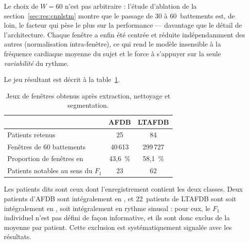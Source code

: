 Le choix de \(W = 60\) n'est pas arbitraire : l'étude d'ablation de la section~\ref{sec:res:cnnlstm} montre que le passage de 30 à 60~battements est, de loin, le facteur qui pèse le plus sur la performance — davantage que le détail de l'architecture. Chaque fenêtre a enfin été centrée et réduite indépendamment des autres (normalisation intra-fenêtre), ce qui rend le modèle insensible à la fréquence cardiaque moyenne du sujet et le force à s'appuyer sur la seule \emph{variabilité} du rythme.

Le jeu résultant est décrit à la table~\ref{tab:meth:donnees}.

\begin{table}[H]
  \centering
  \caption{Jeux de fenêtres obtenus après extraction, nettoyage et segmentation.}
  \label{tab:meth:donnees}
  \begin{tabular}{lcc}
    \toprule
    & \textbf{AFDB} & \textbf{LTAFDB} \\
    \midrule
    Patients retenus                    & 25      & 84 \\
    Fenêtres de 60 battements           & 40\,613 & 299\,727 \\
    Proportion de fenêtres en \FA{}     & 43,6~\% & 58,1~\% \\
    Patients notables au sens du \(F_1\) & 23     & 62 \\
    \bottomrule
  \end{tabular}
\end{table}

\noindent Les patients dits  sont ceux dont l'enregistrement contient les deux classes. Deux patients d'AFDB sont intégralement en \FA{}, et 22~patients de LTAFDB sont soit intégralement en \FA{}, soit intégralement en rythme sinusal : pour eux, le \(F_1\) individuel n'est pas défini de façon informative, et ils sont donc exclus de la moyenne par patient. Cette exclusion est systématiquement signalée avec les résultats.

